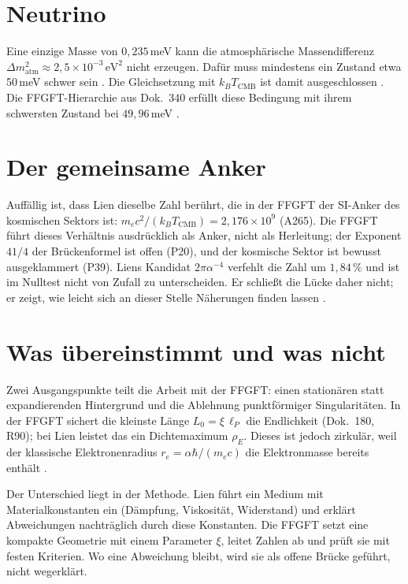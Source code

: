 \section{Neutrino}

Eine einzige Masse von $0{,}235$\,meV kann die atmosphärische
Massendifferenz $\Delta m^2_\text{atm}\approx2{,}5\times10^{-3}\,\text{eV}^2$
nicht erzeugen. Dafür muss mindestens ein Zustand etwa 50\,meV schwer sein
\KM. Die Gleichsetzung mit $k_BT_\text{CMB}$ ist damit ausgeschlossen \XM. Die
FFGFT-Hierarchie aus Dok.~340 erfüllt diese Bedingung mit ihrem schwersten
Zustand bei $49{,}96$\,meV \KM.

\section{Der gemeinsame Anker}

Auffällig ist, dass Lien dieselbe Zahl berührt, die in der FFGFT der
SI-Anker des kosmischen Sektors ist: $m_ec^2/(k_BT_\text{CMB})=2{,}176\times10^9$
(A265). Die FFGFT führt dieses Verhältnis ausdrücklich als Anker, nicht als
Herleitung; der Exponent $41/4$ der Brückenformel ist offen (P20), und der
kosmische Sektor ist bewusst ausgeklammert (P39). Liens Kandidat
$2\pi\alpha^{-4}$ verfehlt die Zahl um $1{,}84\,\%$ und ist im Nulltest nicht
von Zufall zu unterscheiden. Er schließt die Lücke daher nicht; er zeigt,
wie leicht sich an dieser Stelle Näherungen finden lassen \SM.

\section{Was übereinstimmt und was nicht}

Zwei Ausgangspunkte teilt die Arbeit mit der FFGFT: einen stationären
statt expandierenden Hintergrund und die Ablehnung punktförmiger
Singularitäten. In der FFGFT sichert die kleinste Länge
$L_0=\xi\,\ell_P$ die Endlichkeit (Dok.~180, R90); bei Lien leistet das ein
Dichtemaximum $\rho_E$. Dieses ist jedoch zirkulär, weil der klassische
Elektronenradius $r_e=\alpha\hbar/(m_ec)$ die Elektronmasse bereits enthält
\KM.

Der Unterschied liegt in der Methode. Lien führt ein Medium mit
Materialkonstanten ein (Dämpfung, Viskosität, Widerstand) und erklärt
Abweichungen nachträglich durch diese Konstanten. Die FFGFT setzt eine
kompakte Geometrie mit einem Parameter $\xi$, leitet Zahlen ab und prüft sie
mit festen Kriterien. Wo eine Abweichung bleibt, wird sie als offene Brücke
geführt, nicht wegerklärt.

